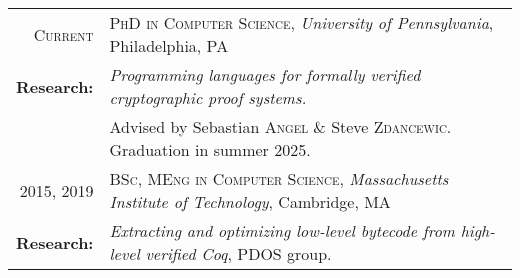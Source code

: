 \begin{tabular}{rl}
\textsc{Current}   & \textsc{PhD in Computer Science}, \emph{University of Pennsylvania}, Philadelphia, PA\\
\textbf{Research:} & \emph{Programming languages for formally verified cryptographic proof systems.} \\
                   & Advised by Sebastian \textsc{Angel} \& Steve \textsc{Zdancewic}. Graduation in summer 2025. \\[0.5em]
2015, 2019         & \textsc{BSc, MEng in Computer Science}, \emph{Massachusetts Institute of Technology}, Cambridge, MA\\
\textbf{Research:} & \emph{Extracting and optimizing low-level bytecode from high-level verified Coq}, PDOS group.
\end{tabular}
